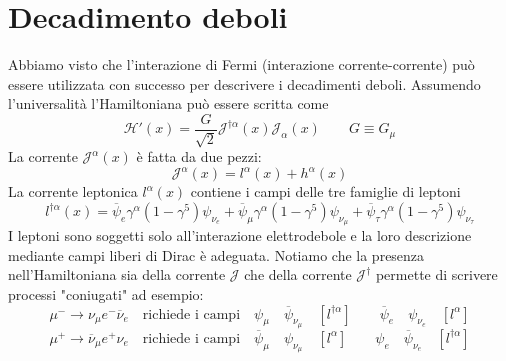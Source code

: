 \section{Decadimento deboli}
Abbiamo visto che l'interazione di Fermi (interazione corrente-corrente) può essere utilizzata con successo per descrivere i decadimenti deboli. Assumendo l'universalità l'Hamiltoniana può essere scritta come
$$
\mathcal{H}'(x) = \frac{G}{\sqrt{2}} \mathcal{J}^{\dagger \alpha} (x) \mathcal{J}_\alpha (x) \quad \quad G \equiv G_\mu
$$
La corrente $\mathcal{J}^\alpha(x)$ è fatta da due pezzi:
$$
\mathcal{J}^\alpha(x) = l^\alpha(x) + h^\alpha(x)
$$
La corrente leptonica $l^\alpha(x)$ contiene i campi delle tre famiglie di leptoni
$$
l^{\dagger \alpha} (x) = \overline{\psi}_e \gamma^\alpha (1 - \gamma^5) \psi_{\nu_e} + \overline{\psi}_\mu \gamma^\alpha (1 - \gamma^5) \psi_{\nu_\mu} + \overline{\psi}_\tau \gamma^\alpha (1 - \gamma^5) \psi_{\nu_\tau}
$$
I leptoni sono soggetti solo all'interazione elettrodebole e la loro descrizione mediante campi liberi di Dirac è adeguata. Notiamo che la presenza nell'Hamiltoniana sia della corrente $\mathcal{J}$ che della corrente $\mathcal{J}^\dagger$ permette di scrivere processi "coniugati" ad esempio:
$$
\mu^- \to \nu_\mu e^- \overline{\nu}_e \quad \text{richiede i campi}\quad \psi_\mu \quad \overline{\psi}_{\nu_\mu} \quad [l^{\dagger \alpha}] \quad \quad \overline{\psi}_e \quad \psi_{\nu_e} \quad [l^\alpha]
$$
$$
\mu^+ \to \overline{\nu}_\mu e^+ \nu_e \quad \text{richiede i campi} \quad \overline{\psi}_\mu \quad \psi_{\nu_\mu} \quad [l^\alpha] \quad \quad \psi_e \quad \overline{\psi}_{\nu_e} \quad [l^{\dagger \alpha}]
$$
